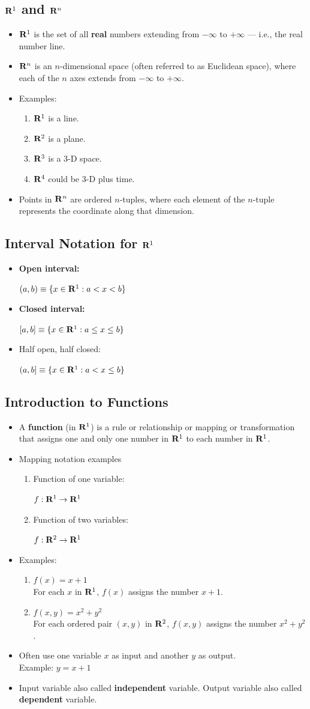 \documentclass[12pt]{extarticle}
\newcommand{\bi}{\begin{itemize}}
\newcommand{\ei}{\end{itemize}}
\newcommand{\be}{\begin{enumerate}}
\newcommand{\ee}{\end{enumerate}}
\newcommand{\ro}{{\bf R}^1 }
\newcommand{\pbt}{\parbox{2in}}
\begin{document}
\subsection{$\ro$ and ${\bf R}^n$}
\bi
\item $\ro$ is the set of all {\bf real} numbers extending from
$-\infty$ to $+\infty$ --- i.e., the real number line.
\item ${\bf R}^n$ is an $n$-dimensional space (often referred to as Euclidean
space), where each of the $n$ axes extends from $-\infty$ to $+\infty$.
\item Examples:
  \be
  \item $\ro$ is a line.
  \item ${\bf R}^2$ is a plane.
  \item ${\bf R}^3$ is a 3-D space.
  \item ${\bf R}^4$ could be 3-D plus time.
  \ee
\item Points in ${\bf R}^n$ are ordered $n$-tuples, where each element
of the $n$-tuple represents the coordinate along that dimension.
\ei


\subsection{Interval Notation for $\ro$}
\bi
\item \pbt{\bf Open interval:} $(a,b)\equiv \{ x\in\ro: a<x<b\}$
\item \pbt{\bf Closed interval:} $[a,b]\equiv \{ x\in\ro: a\le x \le b\}$
\item \pbt{Half open, half closed:} $(a,b]\equiv \{ x\in\ro: a<x\le b\}$
\ei

\subsection{Introduction to Functions}
\bi
\item A {\bf function} (in $\ro$) is a rule or relationship or mapping
or transformation that assigns one and only one number in $\ro$ to each
number in $\ro$.
\item Mapping notation examples
  \be
  \item \pbt{Function of one variable:} $f:\ro\to\ro$
  \item \pbt{Function of two variables:} $f: {\bf R}^2\to\ro$
  \ee
\item Examples:
  \be
  \item $f(x)=x+1$\\
        For each $x$ in $\ro$, $f(x)$ assigns the number $x+1$.
  \item $f(x,y)=x^2+y^2$\\
        For each ordered pair $(x,y)$ in ${\bf R}^2$, $f(x,y)$ assigns
the number $x^2+y^2$.
  \ee
\item Often use one variable $x$ as input and another $y$ as output.\\
Example: $y=x+1$
\item Input variable also called {\bf independent} variable.
Output variable also called {\bf dependent} variable.
\ei
\end{document}
